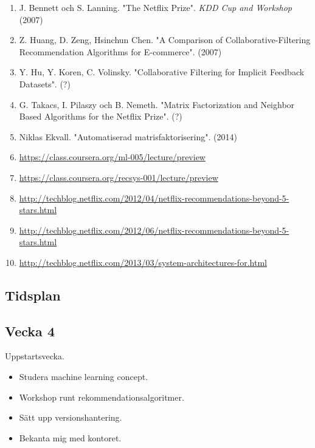 \documentclass[11pt]{article}
\begin{document}
\begin{enumerate}

    \item J. Bennett och S. Lanning. "The Netflix Prize". \textit{KDD Cup and Workshop} (2007)

    \item Z. Huang, D. Zeng, Hsinchun Chen. "A Comparison of Collaborative-Filtering Recommendation Algorithms for E-commerce". (2007)

    \item Y. Hu, Y. Koren, C.  Volinsky. "Collaborative Filtering for Implicit Feedback Datasets". (?)

    \item G. Takacs, I. Pilaszy och B. Nemeth. "Matrix Factorization and Neighbor Based Algorithms for the Netflix Prize". (?)

    \item Niklas Ekvall. "Automatiserad matrisfaktorisering". (2014)

    \item \url{https://class.coursera.org/ml-005/lecture/preview}
    \item \url{https://class.coursera.org/recsys-001/lecture/preview}

    \item \url{http://techblog.netflix.com/2012/04/netflix-recommendations-beyond-5-stars.html}
    \item \url{http://techblog.netflix.com/2012/06/netflix-recommendations-beyond-5-stars.html}
    \item \url{http://techblog.netflix.com/2013/03/system-architectures-for.html}


\end{enumerate}

\newpage


\subsection*{Tidsplan}

\subsection*{Vecka 4}

Uppstartsvecka.

\begin{itemize}
    \item Studera machine learning concept.
    \item Workshop runt rekommendationsalgoritmer.
    \item Sätt upp versionshantering.
    \item Bekanta mig med kontoret.
\end{itemize}
\end{document}
